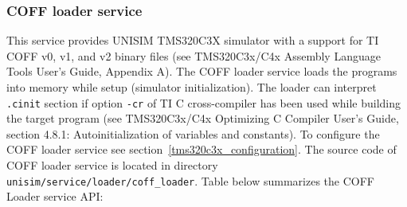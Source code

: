 \subsubsection{COFF loader service}
\label{tms320c3x_coff_loader}

This service provides UNISIM TMS320C3X simulator with a support for TI COFF v0, v1, and v2 binary files (see TMS320C3x/C4x Assembly Language Tools User’s Guide, Appendix A). The COFF loader service loads the programs into memory while setup (simulator initialization). The loader can interpret \texttt{.cinit} section if option \texttt{-cr} of TI C cross-compiler has been used while building the target program (see TMS320C3x/C4x Optimizing C Compiler User’s Guide, section 4.8.1: Autoinitialization of variables and constants).
To configure the COFF loader service see section~\ref{tms320c3x_configuration}.
The source code of COFF loader service is located in directory \texttt{unisim/service/loader/coff\_loader}.
\noindent Table below summarizes the COFF Loader service API:

